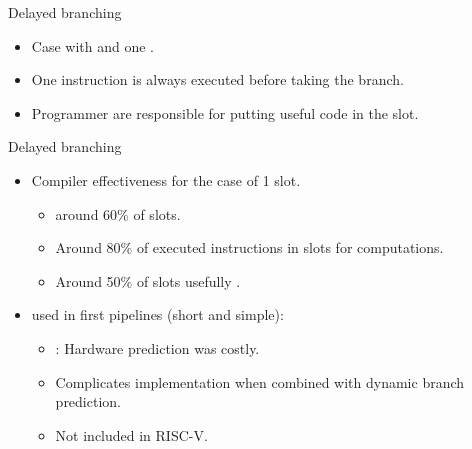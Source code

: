 \begin{frame}[t]{Delayed branching}
\makebox[\textwidth][c]{

}
\begin{itemize}
  \item Case with  and one .
  \item One instruction is always executed before taking the branch.
  \item Programmer are responsible for putting useful code in the slot.
\end{itemize}
\end{frame}

\begin{frame}[t]{Delayed branching}
\begin{itemize}
  \item Compiler effectiveness for the case of 1 slot.
    \begin{itemize}
      \item {} around 60\% of slots.
      \item Around 80\% of executed instructions in slots  for computations.
      \item Around 50\% of slots usefully .
    \end{itemize}

  \item used in first pipelines (short and simple):
    \begin{itemize}
      \item {}: Hardware prediction was costly.
      \item Complicates implementation when combined with dynamic branch prediction.
      \item Not included in RISC-V.
    \end{itemize}

\end{itemize}
\end{frame}

